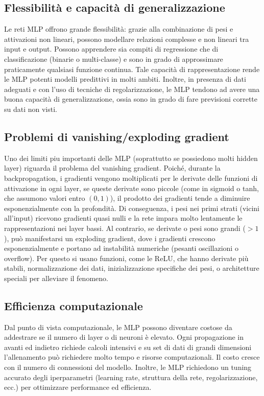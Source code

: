 \documentclass[a4paper,12pt]{report}
\begin{document}
	\subsection{Flessibilità e capacità di generalizzazione}
	Le reti MLP offrono grande flessibilità: grazie alla combinazione di pesi e attivazioni non lineari, possono modellare relazioni complesse e non lineari tra input e output. Possono apprendere sia compiti di regressione che di classificazione (binarie o multi-classe) e sono in grado di approssimare praticamente qualsiasi funzione continua. Tale capacità di rappresentazione rende le MLP potenti modelli predittivi in molti ambiti. Inoltre, in presenza di dati adeguati e con l'uso di tecniche di regolarizzazione, le MLP tendono ad avere una buona capacità di generalizzazione, ossia sono in grado di fare previsioni corrette su dati non visti.
	
	\subsection{Problemi di vanishing/exploding gradient}
	Uno dei limiti piu importanti delle MLP (soprattutto se possiedono molti hidden layer) riguarda il problema del vanishing gradient. Poiché, durante la backpropagation, i gradienti vengono moltiplicati per le derivate delle funzioni di attivazione in ogni layer, se queste derivate sono piccole (come in sigmoid o tanh, che assumono valori entro $(0,1)$), il prodotto dei gradienti tende a diminuire esponenzialmente con la profondità. Di conseguenza, i pesi nei primi strati (vicini all'input) ricevono gradienti quasi nulli e la rete impara molto lentamente le rappresentazioni nei layer bassi.
	Al contrario, se derivate o pesi sono grandi ($>1$), può manifestarsi un exploding gradient, dove i gradienti crescono esponenzialmente e portano ad instabilità numeriche (pesanti oscillazioni o overflow).
	Per questo si usano funzioni, come le ReLU, che hanno derivate più stabili, normalizzazione dei dati, inizializzazione specifiche dei pesi, o architetture speciali per alleviare il fenomeno.
	
	\subsection{Efficienza computazionale}
	Dal punto di vista computazionale, le MLP possono diventare costose da addestrare se il numero di layer o di neuroni è elevato. Ogni propagazione in avanti ed indietro richiede calcoli intensivi e su set di dati di grandi dimensioni l'allenamento può richiedere molto tempo e risorse computazionali. Il costo cresce con il numero di connessioni del modello. Inoltre, le MLP richiedono un tuning accurato degli iperparametri (learning rate, struttura della rete, regolarizzazione, ecc.) per ottimizzare performance ed efficienza.
	
\end{document}
